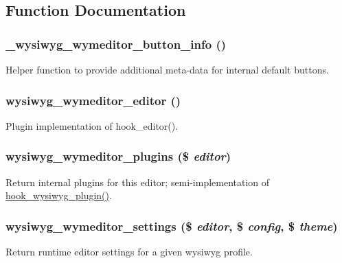 \subsection{Function Documentation}
\hypertarget{wymeditor_8inc_a9eb6f9d6321d723b17aa7c49b85c1143}{
\subsubsection[{\_\-wysiwyg\_\-wymeditor\_\-button\_\-info}]{\setlength{\rightskip}{0pt plus 5cm}\_\-wysiwyg\_\-wymeditor\_\-button\_\-info ()}}
\label{wymeditor_8inc_a9eb6f9d6321d723b17aa7c49b85c1143}
Helper function to provide additional meta-\/data for internal default buttons. \hypertarget{wymeditor_8inc_a08d6b866852dae826ddb11be973dea64}{
\subsubsection[{wysiwyg\_\-wymeditor\_\-editor}]{\setlength{\rightskip}{0pt plus 5cm}wysiwyg\_\-wymeditor\_\-editor ()}}
\label{wymeditor_8inc_a08d6b866852dae826ddb11be973dea64}
Plugin implementation of hook\_\-editor(). \hypertarget{wymeditor_8inc_af8da2ce5ffdff89ca7b131dca3ad15d0}{
\subsubsection[{wysiwyg\_\-wymeditor\_\-plugins}]{\setlength{\rightskip}{0pt plus 5cm}wysiwyg\_\-wymeditor\_\-plugins (\$ {\em editor})}}
\label{wymeditor_8inc_af8da2ce5ffdff89ca7b131dca3ad15d0}
Return internal plugins for this editor; semi-\/implementation of \hyperlink{wysiwyg_8api_8php_abad2b35b32be0b20d73006b73205045c}{hook\_\-wysiwyg\_\-plugin()}. \hypertarget{wymeditor_8inc_a55fa4e1255c1bbda1c4f7057aaaf8103}{
\subsubsection[{wysiwyg\_\-wymeditor\_\-settings}]{\setlength{\rightskip}{0pt plus 5cm}wysiwyg\_\-wymeditor\_\-settings (\$ {\em editor}, \/  \$ {\em config}, \/  \$ {\em theme})}}
\label{wymeditor_8inc_a55fa4e1255c1bbda1c4f7057aaaf8103}
Return runtime editor settings for a given wysiwyg profile.


